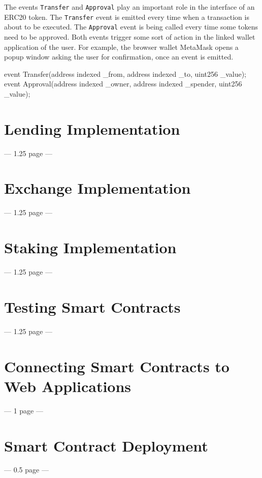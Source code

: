 The events \texttt{Transfer} and \texttt{Approval} play an important role in the interface of an ERC20 token. The \texttt{Transfer} event is emitted every time when a transaction is about to be executed. The \texttt{Approval} event is being called every time some tokens need to be approved. Both events trigger some sort of action in the linked wallet application of the user. For example, the browser wallet MetaMask opens a popup window asking the user for confirmation, once an event is emitted. 
\begin{GenericCode}
event Transfer(address indexed _from, address indexed _to, uint256 _value);
event Approval(address indexed _owner, address indexed _spender, uint256 _value);
\end{GenericCode}

\section{Lending Implementation}
--- 1.25 page ---

\section{Exchange Implementation}
--- 1.25 page ---

\section{Staking Implementation}
--- 1.25 page ---

\section{Testing Smart Contracts}
--- 1.25 page ---

\section{Connecting Smart Contracts to Web Applications}
--- 1 page ---

\section{Smart Contract Deployment}
--- 0.5 page ---
